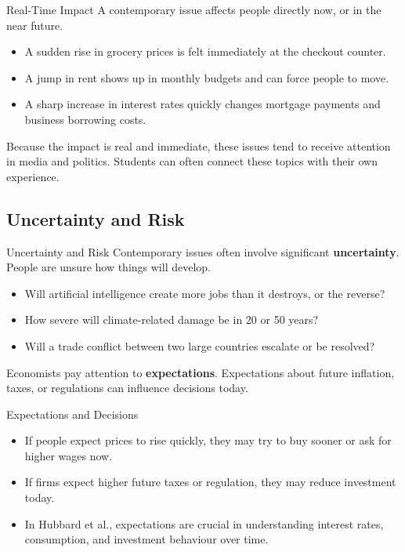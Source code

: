 \documentclass[aspectratio=169]{beamer}
\begin{document}
\begin{frame}{Real-Time Impact}
  \transfade
  A contemporary issue affects people directly now, or in the near future.

  \begin{itemize}[<+->]
    \item A sudden rise in grocery prices is felt immediately at the checkout counter.
    \item A jump in rent shows up in monthly budgets and can force people to move.
    \item A sharp increase in interest rates quickly changes mortgage payments and business
    borrowing costs.
  \end{itemize}

  \vspace{0.3cm}
  Because the impact is real and immediate, these issues tend to receive attention in media
  and politics. Students can often connect these topics with their own experience.
\end{frame}

\subsection{Uncertainty and Risk}

\begin{frame}{Uncertainty and Risk}
  \transfade
  Contemporary issues often involve significant \textbf{uncertainty}. People are unsure how things will develop.

  \begin{itemize}[<+->]
    \item Will artificial intelligence create more jobs than it destroys, or the reverse?
    \item How severe will climate-related damage be in 20 or 50 years?
    \item Will a trade conflict between two large countries escalate or be resolved?
  \end{itemize}

  \vspace{0.3cm}
  Economists pay attention to \textbf{expectations}. Expectations about future inflation, taxes, or
  regulations can influence decisions today.
\end{frame}

\begin{frame}{Expectations and Decisions}
  \transfade
  \begin{itemize}[<+->]
    \item If people expect prices to rise quickly, they may try to buy sooner or ask for higher wages now.
    \item If firms expect higher future taxes or regulation, they may reduce investment today.
    \item In Hubbard et al., expectations are crucial in understanding interest rates, consumption,
    and investment behaviour over time.
  \end{itemize}
\end{frame}
\end{document}
